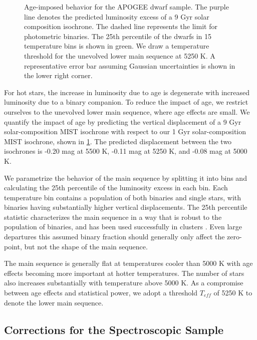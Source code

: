 \documentclass[manuscript]{aastex6}
\newcommand{\Teff}{\ensuremath{T_{eff}}}
\begin{document}
\begin{figure}[htb]
    \centering
    \caption{Age-imposed behavior for the APOGEE dwarf sample. The purple
        line denotes the predicted luminosity excess of a 9 Gyr solar
        composition isochrone. The dashed line represents the limit for 
        photometric binaries. The 25th percentile of the dwarfs in 15 
        temperature bins is shown in green. We draw a temperature threshold 
        for the unevolved lower main sequence at 5250 K. A representative 
        error bar assuming Gaussian uncertainties is shown in the lower right
    corner.}
    \label{fig:ages}
\end{figure}

For hot stars, the increase in luminosity due to age is degenerate with
increased luminosity due to a binary companion. To reduce the impact of age,
we restrict ourselves to the unevolved lower main sequence, where age
effects are small. We quantify the impact of age by predicting the vertical
displacement of a 9 Gyr solar-composition MIST isochrone with respect to our 
1 Gyr solar-composition MIST isochrone, shown in \cref{fig:ages}. The
predicted displacement between the two isochrones is -0.20 mag at 5500 K, 
-0.11 mag at 5250 K, and -0.08 mag at 5000 K.

We parametrize the behavior of the main sequence by splitting it into bins
and calculating the 25th percentile of the luminosity excess in each bin. Each 
temperature bin contains a population of both binaries and single stars, with 
binaries having substantially higher vertical displacements. The 25th 
percentile statistic characterizes the main sequence in a way that is robust 
to the population of binaries, and has been used successfully in clusters 
\citep{An06}. Even large departures this assumed binary fraction should 
generally only affect the zero-point, but not the shape of the main sequence.

The main sequence is generally flat at temperatures cooler than 5000 K with
age effects becoming more important at hotter temperatures. The number of stars
also increases substantially with temperature above 5000 K. As a compromise
between age effects and statistical power, we adopt a threshold \Teff{} of 
5250 K to denote the lower main sequence.

\subsection{Corrections for the Spectroscopic Sample}
\end{document}

